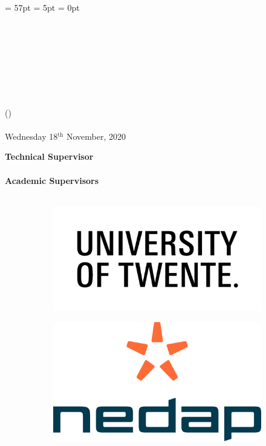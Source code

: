\begin{titlepage}
\headheight = 57pt
\footskip = 5pt
\headsep = 0pt


{\begin{Large}
\university\\
\end{Large} }
\school\\
\department\\

\vspace*{5 cm}



\begin{Large}
\textbf{\doctitle}\\
\end{Large}
\docsubtitle\\
\me \quad (\studentcode)\\\\
{\small Wednesday 18$^\text{th}$ November, 2020}

\begin{flushright}
\textbf{Technical Supervisor}\\ \supervisor\\
\textbf{Academic Supervisors}\\\cosupervisor\\
\cocosupervisor
\end{flushright}

\vspace*{3cm}
\begin{figure}[h]
\centering
\begin{subfigure}{.5\textwidth}
  \centering
  \includegraphics[width=.5\linewidth]{images/utwente.png}
\end{subfigure}%
\begin{subfigure}{.5\textwidth}
  \centering
  \includegraphics[width=.4\linewidth]{images/nedap.png}
\end{subfigure}
\end{figure}





\vfill
\end{titlepage}